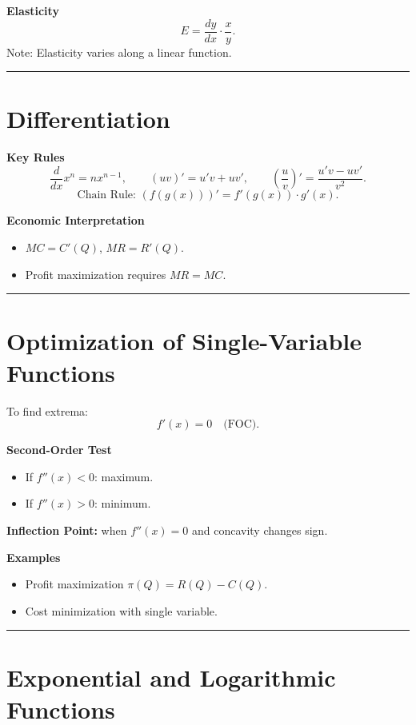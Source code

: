 \documentclass[12pt]{article}
\begin{document}
\textbf{Elasticity}
\[
E = \frac{dy}{dx}\cdot \frac{x}{y}.
\]
Note: Elasticity varies along a linear function.

\hrule
\vspace{10pt}

\section*{Differentiation}

\textbf{Key Rules}
\[
\frac{d}{dx}x^n=nx^{n-1},\qquad
(uv)'=u'v+uv',\qquad
\left(\frac{u}{v}\right)'=\frac{u'v-uv'}{v^2}.
\]
\[
\text{Chain Rule: }(f(g(x)))'=f'(g(x))\cdot g'(x).
\]

\textbf{Economic Interpretation}
\begin{itemize}
    \item \(MC = C'(Q)\), \(MR = R'(Q)\).
    \item Profit maximization requires \(MR=MC\).
\end{itemize}

\hrule
\vspace{10pt}

\section*{Optimization of Single-Variable Functions}

To find extrema:
\[
f'(x)=0 \quad \text{(FOC)}.
\]

\textbf{Second-Order Test}
\begin{itemize}
    \item If \(f''(x)<0\): maximum.
    \item If \(f''(x)>0\): minimum.
\end{itemize}

\textbf{Inflection Point:} when \(f''(x)=0\) and concavity changes sign.

\textbf{Examples}
\begin{itemize}
    \item Profit maximization \(\pi(Q)=R(Q)-C(Q)\).
    \item Cost minimization with single variable.
\end{itemize}

\hrule
\vspace{10pt}

\section*{Exponential and Logarithmic Functions}
\end{document}
